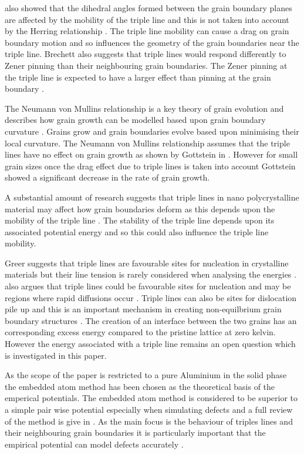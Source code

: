 \documentclass[12pt,a4paper,openany]{report}
\begin{document}
\citeauthor{GOTTSTEIN2010914} also  showed that the dihedral angles formed between the grain boundary planes are affected by the mobility of the triple line and this is not taken into account by the Herring relationship \cite{GOTTSTEIN2010914}. The triple line mobility can cause a drag on grain boundary motion and so influences the geometry of the grain boundaries near the triple line. Brechett also suggests that triple lines would respond differently to Zener pinning than their neighbouring grain boundaries. The Zener pinning at the triple line is expected to have a larger effect than pinning at the grain boundary \cite{BRECHET2010910}.

The Neumann von Mullins relationship is a key theory of grain evolution and describes how grain growth can be modelled based upon grain boundary curvature \cite{Lazar2011}. Grains grow and grain boundaries evolve based upon minimising their local curvature. The Neumann von Mullins relationship assumes that the triple lines have no effect on grain growth as shown by Gottstein in \cite{GOTTSTEIN2010914}. However for small grain sizes once the drag effect due to triple lines is taken into account Gottstein showed a significant decrease in the rate of grain growth.

A substantial amount of research suggests that triple lines in nano polycrystalline material may affect how grain boundaries deform as this depends upon the mobility of the triple line \cite{Shvindlerman2005,BRECHET2010910, Fischer2012,
GOTTSTEIN2000, ZOLLNER201241, Miessen2015, Thomas2019}. The stability of the triple line depends upon its associated potential energy and so this could also influence the triple line mobility. 

Greer suggests that triple lines are favourable sites for nucleation in crystalline materials but their line tension is rarely considered when analysing the energies   \cite{GREER2010899}. \citeauthor{King2010} also argues that triple lines could be favourable sites for nucleation and may be   regions where rapid diffusions occur \cite{King2010}. Triple lines can also be sites for dislocation pile up and this is an important mechanism in creating non-equilbrium grain boundary structures \cite{Nazarov1993}. The creation of an interface between the two grains has an corresponding excess energy compared to the pristine lattice at zero kelvin. However the energy associated with a triple line remains an open question which is investigated in this paper.

As the scope of the paper is restricted to a pure Aluminium in the solid phase the embedded atom method has been chosen as the theoretical basis of the emperical potentials. The embedded atom method is considered to be superior to a simple pair wise potential especially when simulating defects and a full review of the method is give in \cite{Daw1993}. As the main focus is the behaviour of triples lines and their neighbouring grain boundaries it is particularly important that the empirical potential can model defects accurately . 
\end{document}

